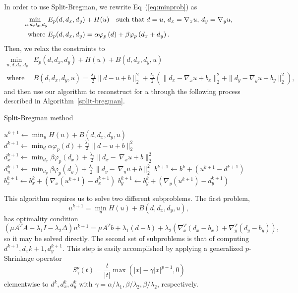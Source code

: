 \documentclass[english]{article}\usepackage[]{graphicx}\usepackage[]{color}
\begin{document}
In order to use Split-Bregman, we rewrite Eq~(\ref{eq:minprob}) as
\begin{align}
\underset{u,d,d_{x},d_{y}}{{\text{{min }}}}&E_{p}(d,d_x,d_y)+H(u)\quad\text{such that}\; d=u,\, d_{x}=\nabla_{x}u,\, d_{y}=\nabla_{y}u,  \notag\\
\text{where }&E_p(d,d_x,d_y)=\alpha\varphi_p\left(d\right)+\beta\varphi_p\left(d_x +
 d_y\right).\notag
\end{align}
Then, we relax the constraints to
\begin{align*}
\underset{u,d,d_{x},d_{y}}{{\text{{min }}}}&E_{p}(d,d_x,d_y)+H(u)+B(d,d_x,d_y,u)\\
\text{where }&B(d,d_x,d_y,u)=\frac{\lambda_1}{2}\|d-u+b\|_{2}^{2}+\frac{\lambda_2}{2}\left(\|d_{x}-\nabla_{x}u+b_{x}\|_{2}^{2}+\|d_{y}-\nabla_{y}u+b_{y}\|_{2}^{2}\right),
\end{align*}
and then use our algorithm to reconstruct for $u$ through the following process described in Algorithm~\ref{split-bregman}.

\begin{algorithm}[H]
\caption{Split-Bregman method}\label{split-bregman}
\begin{algorithmic}[1]
\State $u^{k+1}\gets \min_u{H(u)+B(d,d_x,d_y,u)}$
\State $d^{k+1}\gets \min_d{\alpha\varphi_p(d)+\frac{\lambda_1}{2}\|d-u+b\|_2^2}$
\State $d_x^{k+1}\gets \min_{d_x}{\beta\varphi_p(d_x)+\frac{\lambda_2}{2}\|d_x-\ \nabla_xu+b\|_2^2}$
\State $d_y^{k+1}\gets \min_{d_y}{\beta\varphi_p(d_y)+\frac{\lambda_2}{2}\|d_y-\ \nabla_yu+b\|_2^2}$
\EndFor
\State $b^{k+1}\gets b^{k}+\left(u^{k+1}-d^{k+1}\right)$
\State $b_x^{k+1}\gets b_x^{k}+\left(\nabla_x \left(u^{k+1}\right) - d_x^{k+1}\right)$
\State $b_y^{k+1}\gets b_y^{k}+\left(\nabla_y \left(u^{k+1}\right) - d_y^{k+1}\right)$
\EndWhile

\EndProcedure
\end{algorithmic}
\end{algorithm}

This algorithm requires us to solve two different subproblems. The first problem, \[u^{k+1}=\min_u{H(u)+B(d,d_x,d_y,u)},\] has optimality condition
\[\left(\mu A^TA + \lambda_1I - \lambda_2\Delta\right)u^{k+1}=\mu A^Tb + \lambda_1(d-b)+\lambda_2\left(\nabla_x^T(d_x-b_x)+\nabla_y^T(d_y-b_y)\right),\]
so it may be solved directly. The second set of subproblems is that of computing $d^{k+1},d_x{k+1},d_y^{k+1}$. This step is easily 
accomplished by applying a generalized $p$-Shrinkage operator
\[S_\gamma^p(t)=\frac{t}{|t|}\max\left({|x|-\gamma|x|^{p-1},0}\right)\]
elementwise to $d^k,d_x^k,d_y^k$ with $\gamma = \alpha/\lambda_1, \beta/\lambda_2, \beta/\lambda_2$, respectively.
\end{document}
